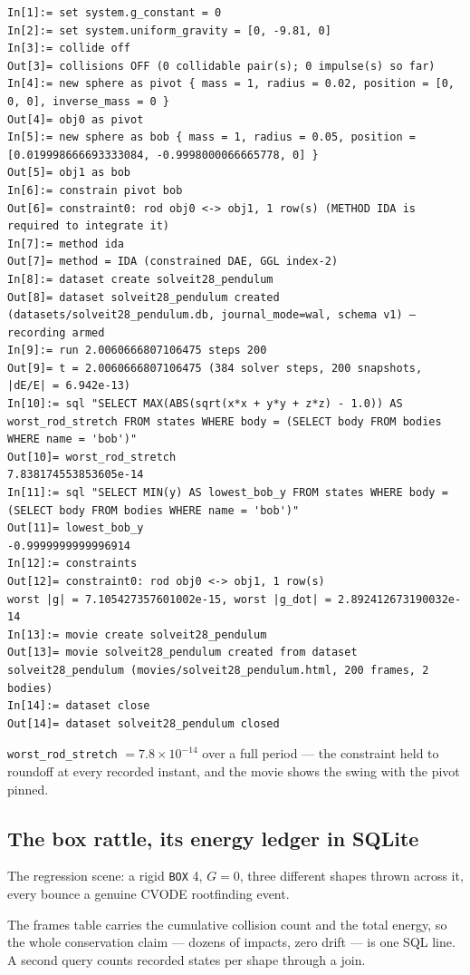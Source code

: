 \documentclass[11pt]{article}
\newcommand{\kw}[1]{\texttt{\uppercase{#1}}}
\newcommand{\code}[1]{\texttt{#1}}
\begin{document}
\begin{lstlisting}
In[1]:= set system.g_constant = 0
In[2]:= set system.uniform_gravity = [0, -9.81, 0]
In[3]:= collide off
Out[3]= collisions OFF (0 collidable pair(s); 0 impulse(s) so far)
In[4]:= new sphere as pivot { mass = 1, radius = 0.02, position = [0, 0, 0], inverse_mass = 0 }
Out[4]= obj0 as pivot
In[5]:= new sphere as bob { mass = 1, radius = 0.05, position = [0.019998666693333084, -0.9998000066665778, 0] }
Out[5]= obj1 as bob
In[6]:= constrain pivot bob
Out[6]= constraint0: rod obj0 <-> obj1, 1 row(s) (METHOD IDA is required to integrate it)
In[7]:= method ida
Out[7]= method = IDA (constrained DAE, GGL index-2)
In[8]:= dataset create solveit28_pendulum
Out[8]= dataset solveit28_pendulum created (datasets/solveit28_pendulum.db, journal_mode=wal, schema v1) — recording armed
In[9]:= run 2.0060666807106475 steps 200
Out[9]= t = 2.0060666807106475 (384 solver steps, 200 snapshots, |dE/E| = 6.942e-13)
In[10]:= sql "SELECT MAX(ABS(sqrt(x*x + y*y + z*z) - 1.0)) AS worst_rod_stretch FROM states WHERE body = (SELECT body FROM bodies WHERE name = 'bob')"
Out[10]= worst_rod_stretch
7.838174553853605e-14
In[11]:= sql "SELECT MIN(y) AS lowest_bob_y FROM states WHERE body = (SELECT body FROM bodies WHERE name = 'bob')"
Out[11]= lowest_bob_y
-0.9999999999996914
In[12]:= constraints
Out[12]= constraint0: rod obj0 <-> obj1, 1 row(s)
worst |g| = 7.105427357601002e-15, worst |g_dot| = 2.892412673190032e-14
In[13]:= movie create solveit28_pendulum
Out[13]= movie solveit28_pendulum created from dataset solveit28_pendulum (movies/solveit28_pendulum.html, 200 frames, 2 bodies)
In[14]:= dataset close
Out[14]= dataset solveit28_pendulum closed
\end{lstlisting}

\code{worst\_rod\_stretch} $= 7.8\times10^{-14}$ over a full period
--- the constraint held to roundoff at every recorded instant, and the
movie shows the swing with the pivot pinned.

\subsection{The box rattle, its energy ledger in SQLite}

The regression scene: a rigid \kw{box} 4, $G = 0$, three different
shapes thrown across it, every bounce a genuine CVODE rootfinding
event.

The frames table carries the cumulative collision count and the total
energy, so the whole conservation claim --- dozens of impacts, zero
drift --- is one SQL line. A second query counts recorded states per
shape through a join.
\end{document}
